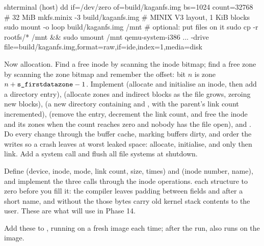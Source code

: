 \documentclass[11pt,a4paper]{article}
\begin{document}
\begin{lst}{sh}{terminal (host)}
dd if=/dev/zero of=build/kaganfs.img bs=1024 count=32768     # 32 MiB
mkfs.minix -3 build/kaganfs.img                               # MINIX V3 layout, 1 KiB blocks
sudo mount -o loop build/kaganfs.img /mnt                     # optional: put files on it
sudo cp -r rootfs/* /mnt && sudo umount /mnt
qemu-system-i386 ... -drive file=build/kaganfs.img,format=raw,if=ide,index=1,media=disk
\end{lst}

Now allocation. Find a free inode by scanning the inode bitmap; find a free zone by scanning the zone bitmap and
remember the offset: bit $n$ is zone $n + \code{s_firstdatazone} - 1$. Implement  (allocate and
initialise an inode, then add a directory entry),  (allocate zones and indirect blocks as the file grows,
zeroing new blocks),  (a new directory containing  and , with the parent's link count
incremented),  (remove the entry, decrement the link count, and free the inode and its zones when the
count reaches zero and nobody has the file open), and . Do every change through the buffer cache,
marking buffers dirty, and order the writes so a crash leaves at worst leaked space: allocate, initialise, and only then
link. Add a  system call and flush all file systems at shutdown.

Define  (device, inode, mode, link count, size, times) and  (inode number, name),
and implement the three calls through the inode operations.  each structure to zero before you fill
it: the compiler leaves padding between fields and after a short name, and without the  those bytes
carry old kernel stack contents to the user. These are what  will use in Phase 14.

Add these to , running on a fresh image each time; after the run,  also runs
 on the image.
\end{document}
